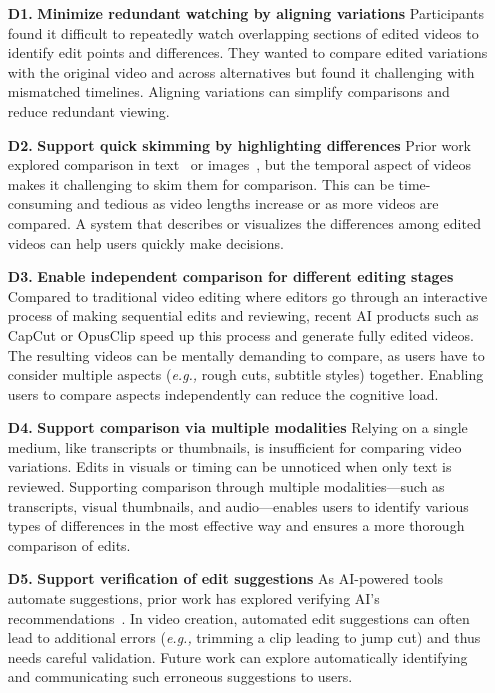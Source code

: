 \begin{itemize}
    \item[\textbf{D1.}] \textbf{Minimize redundant watching by aligning variations} 
    Participants found it difficult to repeatedly watch overlapping sections of edited videos to identify edit points and differences. They wanted to compare edited variations with the original video and across alternatives but found it challenging with mismatched timelines. Aligning variations can simplify comparisons and reduce redundant viewing. 
    
    \item[\textbf{D2.}] \textbf{Support quick skimming by highlighting differences}
    Prior work explored comparison in text~\cite{reza2023abscribe, gero2024supporting} or images~\cite{huh2023genassist, almeda2024prompting}, but the temporal aspect of videos makes it challenging to skim them for comparison. This can be time-consuming and tedious as video lengths increase or as more videos are compared. A system that describes or visualizes the differences among edited videos can help users quickly make decisions.
    \item[\textbf{D3.}] \textbf{Enable independent comparison for different editing stages} Compared to traditional video editing where editors go through an interactive process of making sequential edits and reviewing, recent AI products such as CapCut or OpusClip speed up this process and generate fully edited videos. The resulting videos can be mentally demanding to compare, as users have to consider multiple aspects (\textit{e.g.,} rough cuts, subtitle styles) together. Enabling users to compare aspects independently can reduce the cognitive load.
     \item[\textbf{D4.}] \textbf{Support comparison via multiple modalities} Relying on a single medium, like transcripts or thumbnails, is insufficient for comparing video variations. Edits in visuals or timing can be unnoticed when only text is reviewed. Supporting comparison through multiple modalities—such as transcripts, visual thumbnails, and audio—enables users to identify various types of differences in the most effective way and ensures a more thorough comparison of edits.
    \item[\textbf{D5.}] \textbf{Support verification of edit suggestions} As AI-powered tools automate suggestions, prior work has explored verifying AI's recommendations~\cite{huh2023genassist, ferdowsi2024validating}. In video creation, automated edit suggestions can often lead to additional errors (\textit{e.g.,} trimming a clip leading to jump cut) and thus needs careful validation. Future work can explore automatically identifying and communicating such erroneous suggestions to users.

\end{itemize}
